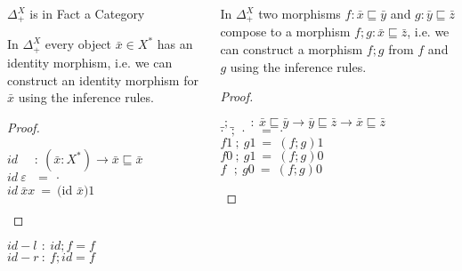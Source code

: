 \documentclass[aspectratio=169]{beamer}
\theoremstyle{remarkstyle}
\begin{document}
\begin{frame}[fragile]
  \begin{columns}
    \begin{column}{0.35\textwidth}
      \large{\color{blue} $Δ_+^X$ is in Fact a Category}
      \begin{lemma}
        \begin{small}
          In $Δ_+^X$ every object $\bar{x} ∈ X^*$ has an identity morphism, 
          i.e. we can construct an identity morphism for $\bar{x}$ using the inference rules.
        \end{small}
      \end{lemma}
      \begin{proof}
        \begin{small}
        $id \ \ \ \ \ \ : \ (\bar{x} : X^*) → \bar{x} ⊑ \bar{x}$\\
        $id \ ε \ \ \ = \ ·$\\
        $id \ \bar{x} x \ = \ ($id $ \bar{x})1$
        \end{small}
      \end{proof}
      \begin{corollary}
        \begin{small}
        $id-l \ \, : \ id ; f = f$ \\
        $id-r \ : \ f;id = f$
        \end{small}
      \end{corollary}  
    \end{column}
    \begin{column}{0.6\textwidth}
      \begin{lemma}
        \begin{small}
        In $Δ_+^X$ two morphisms $f : \bar{x} ⊑ \bar{y}$ and $g : \bar{y} ⊑ \bar{z}$ 
        compose to a morphism $f;g : \bar{x} ⊑ \bar{z}$, 
        i.e. we can construct a morphism $f;g$ from $f$ and $g$ using the inference rules.
        \end{small}
      \end{lemma}
      \begin{proof}
        \begin{small}
        $\_;\_ \ \ \ \ \ \ : \ \bar{x} ⊑ \bar{y} → \bar{y} ⊑ \bar{z} → \bar{x} ⊑ \bar{z}$\\
        $·  \ \ \, ; \ · \ \ \ \ = \ ·$\\
        $f 1  \ ; \ g 1 \ = \ (f;g)1$\\
        $f 0 \ ; \ g 1  \ = \ (f;g)0$\\
        $f \ \ \, ; \ g 0 \ = \ (f;g)0$

\end{small}
\end{proof}
\end{column}
\end{columns}
\end{frame}
\end{document}
